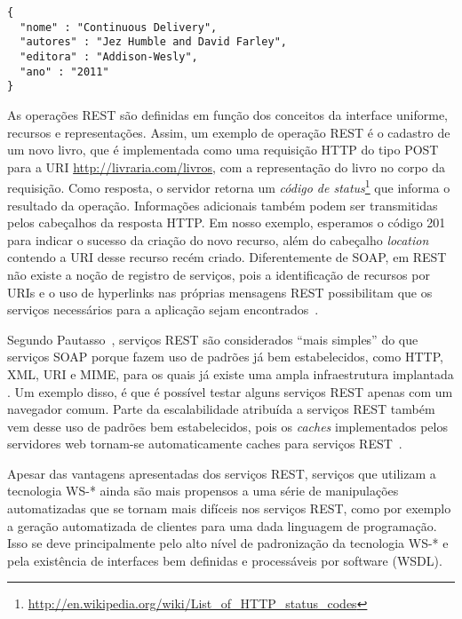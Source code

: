 \begin{lstlisting}[frame=trbl, label=lst:json, caption=Representação JSON do recurso /livros/2.]
{
  "nome" : "Continuous Delivery",
  "autores" : "Jez Humble and David Farley",
  "editora" : "Addison-Wesly",
  "ano" : "2011"
}
\end{lstlisting}

As operações REST são definidas em função dos conceitos da interface uniforme, recursos e representações. Assim, um exemplo de operação REST é o cadastro de um novo livro, que é implementada como uma requisição HTTP do tipo POST para a URI \url{http://livraria.com/livros}, com a representação do livro no corpo da requisição. Como resposta, o servidor retorna um \emph{código de status}\footnote{\url{http://en.wikipedia.org/wiki/List_of_HTTP_status_codes}} que informa o resultado da operação. 
Informações adicionais também podem ser transmitidas pelos cabeçalhos da resposta HTTP.
Em nosso exemplo, esperamos o código 201 para indicar o sucesso da criação do novo recurso, além do cabeçalho \emph{location} contendo a URI desse recurso recém criado.
Diferentemente de SOAP, em REST não existe a noção de registro de serviços, pois a identificação de recursos por URIs e o uso de hyperlinks nas próprias mensagens REST possibilitam que os serviços necessários para a aplicação sejam encontrados~\cite{Pautasso2008Restful}.

Segundo Pautasso~\cite{Pautasso2008Restful}, serviços REST são considerados ``mais simples'' do que serviços SOAP porque fazem uso de padrões já bem estabelecidos, como HTTP, XML, URI e MIME, para os quais já existe uma ampla infraestrutura implantada . Um exemplo disso, é que é possível testar alguns serviços REST apenas com um navegador comum. Parte da escalabilidade atribuída a serviços REST também vem desse uso de padrões bem estabelecidos, pois os \emph{caches} implementados pelos servidores web tornam-se automaticamente caches para serviços REST~\cite{Tong2010CXF}.

Apesar das vantagens apresentadas dos serviços REST, serviços que utilizam a tecnologia WS-* ainda são mais propensos a uma série de manipulações automatizadas que se tornam mais difíceis nos serviços REST, como por exemplo a geração automatizada de clientes para uma dada linguagem de programação. Isso se deve principalmente pelo alto nível de padronização da tecnologia WS-*  e pela existência de interfaces bem definidas e processáveis por software (WSDL). 

